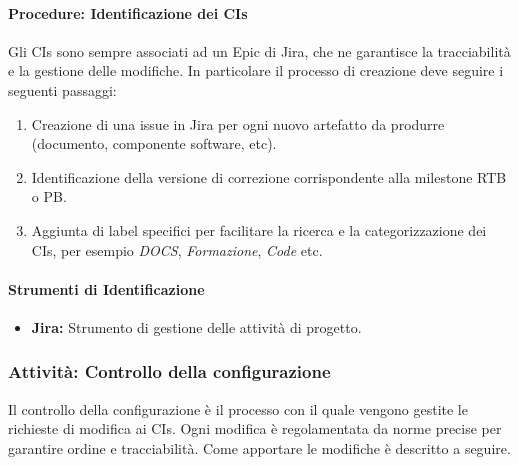 \documentclass[a4paper,12pt]{article}
\begin{document}
\paragraph{Procedure: Identificazione dei CIs} \label{identificazioneCIs}
Gli CIs sono sempre associati ad un Epic di Jira, che ne garantisce la
tracciabilità e la gestione delle modifiche. In particolare il processo di
creazione deve seguire i seguenti passaggi:
\begin{enumerate}
    \item Creazione di una issue in Jira per ogni nuovo artefatto da produrre (documento,
          componente software, etc).
    \item Identificazione della versione di correzione corrispondente alla milestone RTB o PB.
    \item Aggiunta di label specifici per facilitare la ricerca e la categorizzazione
          dei CIs, per esempio \textit{DOCS}, \textit{Formazione}, \textit{Code} etc.
\end{enumerate}
\paragraph{Strumenti di Identificazione}
\begin{itemize}
    \item \textbf{Jira:} Strumento di gestione delle attività di progetto.
\end{itemize}

\subsubsection{Attività: Controllo della configurazione}\label{controlloConfig}
Il controllo della configurazione è il processo con il quale vengono gestite le richieste di modifica ai CIs. Ogni modifica è regolamentata da norme precise per garantire
ordine e tracciabilità. Come apportare le modifiche è descritto a seguire.
\end{document}
